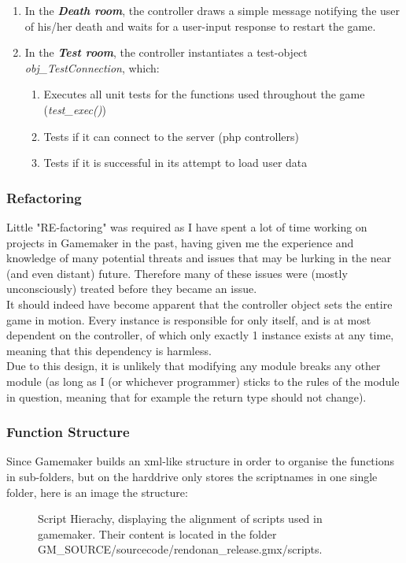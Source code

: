 \documentclass[12pt]{report}
\begin{document}
\begin{enumerate}
\begin{enumerate}
\end{enumerate}
\item In the \emph{\textbf{Death room}}, the controller draws a simple message notifying the user of his/her death and waits for a user-input response to restart the game.
\item In the \emph{\textbf{Test room}}, the controller instantiates a test-object \emph{obj\_TestConnection}, which:
\begin{enumerate}
\item Executes all unit tests for the functions used throughout the game (\emph{test\_exec()})
\item Tests if it can connect to the server (php controllers)
\item Tests if it is successful in its attempt to load user data
\end{enumerate}
\end{enumerate}
\subsubsection{Refactoring}
Little "RE-factoring" was required as I have spent a lot of time working on projects in Gamemaker in the past, having given me the experience and knowledge of many potential threats and issues that may be lurking in the near (and even distant) future. Therefore many of these issues were (mostly unconsciously) treated before they became an issue.\\
It should indeed have become apparent that the controller object sets the entire game in motion. Every instance is responsible for only itself, and is at most dependent on the controller, of which only exactly 1 instance exists at any time, meaning that this dependency is harmless.\\
Due to this design, it is unlikely that modifying any module breaks any other module (as long as I (or whichever programmer) sticks to the rules of the module in question, meaning that for example the return type should not change).\\

\subsubsection{Function Structure}
Since Gamemaker builds an xml-like structure in order to organise the functions in sub-folders, but on the harddrive only stores the scriptnames in one single folder, here is an image the structure:

\begin{figure}[h]
\caption{Script Hierachy, displaying the alignment of scripts used in gamemaker. Their content is located in the folder GM\_SOURCE/sourcecode/rendonan\_release.gmx/scripts.}
\end{figure}
\vspace{2em}
\end{document}

